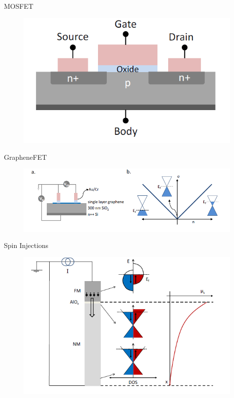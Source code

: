 \documentclass[handout,t]{beamer}
\begin{document}
\begin{frame}{MOSFET}
	\begin{figure}[!ht]
		\centering
		\includegraphics[width= 0.8\linewidth]{../figures/MOSFET.png}
		\label{fig:mosfet}
	\end{figure}
\end{frame}
\begin{frame}{GrapheneFET}
	\begin{figure}[!ht]
		\centering
		\includegraphics[width=\linewidth]{../figures/GrapheneFET.png}
		\label{fig:graphenefet}
	\end{figure}
\end{frame}
\begin{frame}{Spin Injections}
	\begin{figure}[!ht]
		\centering
		\includegraphics[width=\linewidth]{../figures/spininjection.png}
		\label{fig:spininjection}
	\end{figure}
\end{frame}
\end{document}
